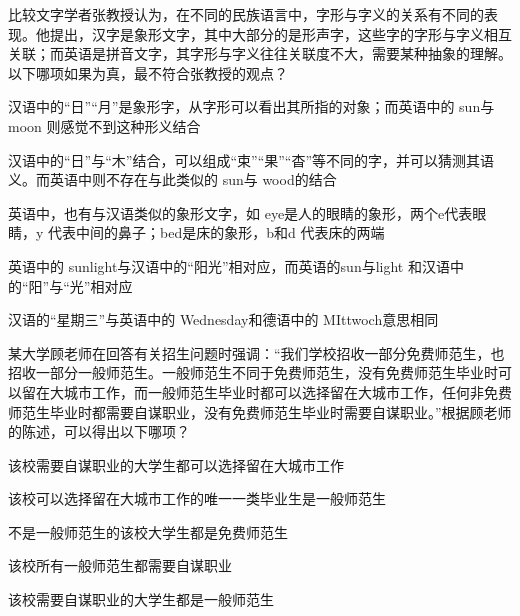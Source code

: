 \documentclass{exam-zh}
\begin{document}
\begin{question}
  比较文字学者张教授认为，在不同的民族语言中，字形与字义的关系有不同的表现。他提出，汉字是象形文字，其中大部分的是形声字，这些字的字形与字义相互关联；而英语是拼音文字，其字形与字义往往关联度不大，需要某种抽象的理解。以下哪项如果为真，最不符合张教授的观点？ \paren

  \begin{choices}
    \item 汉语中的“日”“月”是象形字，从字形可以看出其所指的对象；而英语中的 sun与moon 则感觉不到这种形义结合
    \item 汉语中的“日”与“木”结合，可以组成“束”“果”“杳”等不同的字，并可以猜测其语义。而英语中则不存在与此类似的 sun与 wood的结合
    \item 英语中，也有与汉语类似的象形文字，如 eye是人的眼睛的象形，两个e代表眼睛，y 代表中间的鼻子；bed是床的象形，b和d 代表床的两端
    \item 英语中的 sunlight与汉语中的“阳光”相对应，而英语的sun与light 和汉语中的“阳”与“光”相对应
    \item 汉语的“星期三”与英语中的 Wednesday和德语中的 MIttwoch意思相同
  \end{choices}
\end{question}

\begin{question}
  某大学顾老师在回答有关招生问题时强调：“我们学校招收一部分免费师范生，也招收一部分一般师范生。一般师范生不同于免费师范生，没有免费师范生毕业时可以留在大城市工作，而一般师范生毕业时都可以选择留在大城市工作，任何非免费师范生毕业时都需要自谋职业，没有免费师范生毕业时需要自谋职业。”根据顾老师的陈述，可以得出以下哪项？ \paren

  \begin{choices}
    \item 该校需要自谋职业的大学生都可以选择留在大城市工作
    \item 该校可以选择留在大城市工作的唯一一类毕业生是一般师范生
    \item 不是一般师范生的该校大学生都是免费师范生
    \item 该校所有一般师范生都需要自谋职业
    \item 该校需要自谋职业的大学生都是一般师范生
  \end{choices}
\end{question}
\end{document}
